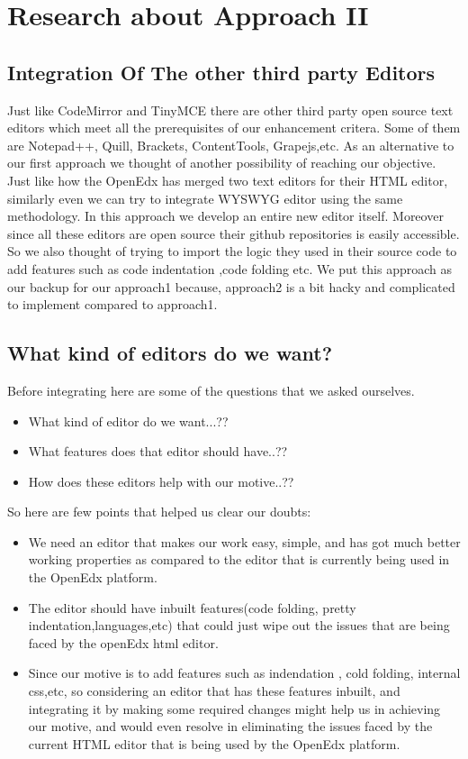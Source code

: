 \chapter{Research about Approach II}
\section{Integration Of The other third party Editors}
Just like CodeMirror and TinyMCE there are other third party open source text editors
which meet all the prerequisites of our enhancement critera. Some of them are Notepad++,
Quill, Brackets, ContentTools, Grapejs,etc. As an alternative to our first approach we
thought of another possibility of reaching our objective. Just like how the OpenEdx has
merged two text editors for their HTML editor, similarly even we can try to integrate
WYSWYG editor using the same methodology. In this approach we develop an entire new
editor itself. Moreover since all these editors are open source their github repositories is
easily accessible. So we also thought of trying to import the logic they used in their source
code to add features such as code indentation ,code folding etc. We put this approach as our
backup for our approach1 because, approach2 is a bit hacky and complicated to implement
compared to approach1. 
\section{What kind of editors do we want?}  
Before integrating here are some of the questions that we asked ourselves. \newline
\begin{itemize}
\item What kind of editor do we want...??
\item What features does that editor should have..??
\item How does these editors help with our motive..?? \newline 
\end{itemize}
So here are few points that helped us clear our doubts: \newline
\begin{itemize}
\item We need an editor that makes our work easy, simple, and has got much better working
properties as compared to the editor that is currently being used in the OpenEdx platform.
\item The editor should have inbuilt features(code folding, pretty indentation,languages,etc) that
could just wipe out the issues that are being faced by the openEdx html editor.
\item Since our motive is to add features such as indendation , cold folding, internal css,etc, so
considering an editor that has these features inbuilt, and integrating it by making some
required changes might help us in achieving our motive, and would even resolve in
eliminating the issues faced by the current HTML editor that is being used by the OpenEdx
platform. \newline
\end{itemize}

